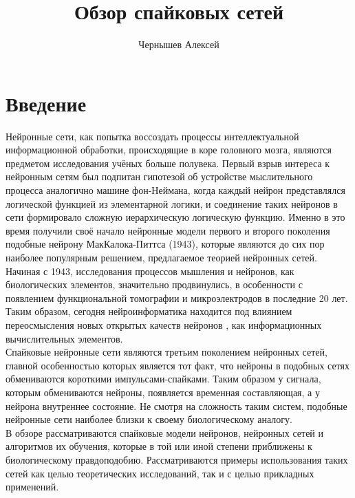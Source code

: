 \documentclass[a4paper,10pt]{article}
\title{Обзор спайковых сетей}
\author{Чернышев Алексей}
\begin{document}


\tableofcontents
\clearpage
\section{Введение}
\indent Нейронные сети, как попытка воссоздать процессы интеллектуальной информационной обработки, происходящие в коре головного мозга, являются предметом исследования учёных больше полувека. Первый взрыв интереса к нейронным сетям был подпитан гипотезой об устройстве мыслительного процесса аналогично машине фон-Неймана, когда каждый нейрон представлялся логической функцией из элементарной логики, и соединение таких нейронов в сети формировало сложную иерархическую логическую функцию. Именно в это время получили своё начало нейронные модели первого и второго поколения подобные нейрону МакКалока-Питтса (1943), которые являются до сих пор наиболее популярным решением, предлагаемое теорией нейронных сетей.\\
\indent Начиная с 1943, исследования процессов мышления и нейронов, как биологических элементов, значительно продвинулись, в особенности с появлением функциональной томографии и микроэлектродов в последние 20 лет. Таким образом, сегодня нейроинформатика находится под влиянием переосмысления новых открытых качеств нейронов \cite{BohteReview}, как информационных вычислительных элементов.\\
\indent Спайковые нейронные сети являются третьим поколением нейронных сетей, главной особенностью которых является тот факт, что нейроны в подобных сетях обмениваются короткими импульсами-спайками. Таким образом у сигнала, которым обмениваются нейроны, появляется временная составляющая, а у нейрона внутреннее состояние. Не смотря на сложность таким систем, подобные нейронные сети наиболее близки к своему биологическому аналогу.\\
\indent В обзоре рассматриваются спайковые модели нейронов, нейронных сетей и алгоритмов их обучения, которые в той или иной степени приближены к биологическому правдоподобию. Рассматриваются примеры использования таких сетей как целью теоретических исследований, так и с целью прикладных применений.\\
\end{document}
